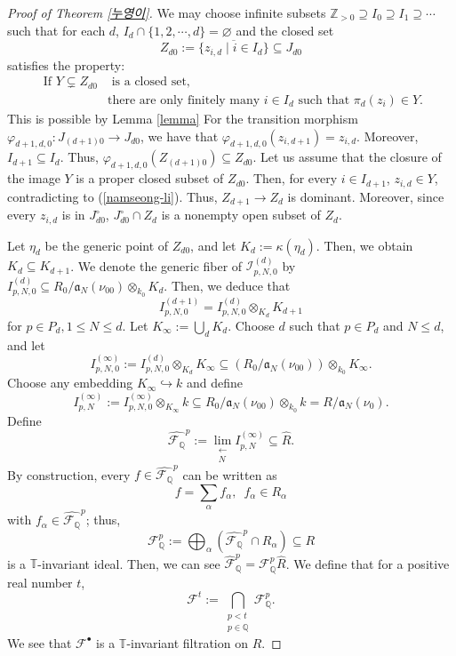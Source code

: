 \documentclass[a4paper,12pt]{amsart}
\theoremstyle{definition} %
\theoremstyle{remark}
\numberwithin{equation}{section}
\newcommand{\Z}{\mathbb{Z}}
\newcommand{\Q}{\mathbb{Q}}
\begin{document}
\begin{proof}[Proof of Theorem \ref{누영이}]
\smallskip

We may choose infinite subsets $\Z_{>0}\supseteq I_0\supseteq I_1\supseteq \cdots$ such that for each $d$, $I_d\cap \{1,2,\cdots,d\}=\varnothing$ and the closed set
$$ Z_{d0}:=\overline{\{z_{i,d}\mid i\in I_d\}}\subseteq J_{d0} $$
satisfies the property:
\begin{equation} \label{namseong-li}
\begin{aligned}\text{ If }Y\subsetneq Z_{d0}&\text{ is a closed set, }\\ &\text{there are only finitely many }i\in I_d\text{ such that }\pi_d(z_i)\in Y.
\end{aligned}
\end{equation}
This is possible by Lemma \ref{lemma} For the transition morphism $\varphi_{d+1,d,0}:J_{(d+1)0}\to J_{d0}$, we have that $\varphi_{d+1,d,0}(z_{i,d+1})=z_{i,d}$. Moreover, $I_{d+1}\subseteq I_d$. Thus, $\varphi_{d+1,d,0}(Z_{(d+1)0})\subseteq Z_{d0}$. Let us assume that the closure of the image $Y$ is a proper closed subset of $Z_{d0}$. Then, for every $i\in I_{d+1}$, $z_{i,d}\in Y$, contradicting to (\ref{namseong-li}). Thus, $Z_{d+1}\to Z_d$ is dominant. Moreover, since every $z_{i,d}$ is in $J^{\circ}_{d0}$, $J^{\circ}_{d0}\cap Z_d$ is a nonempty open subset of $Z_d$.

\smallskip

Let $\eta_d$ be the generic point of $Z_{d0}$, and let $K_d:=\kappa(\eta_d)$. Then, we obtain $K_d\subseteq K_{d+1}$. We denote the generic fiber of $\mathcal{I}^{(d)}_{p,N,0}$ by $I^{(d)}_{p,N,0}\subseteq R_{0}/\mathfrak{a}_N(\nu_{00})\otimes_{k_0} K_d$. Then, we deduce that
$$ I^{(d+1)}_{p,N,0}=I^{(d)}_{p,N,0}\otimes_{K_d}K_{d+1}$$
for $p\in P_d,1\le N\le d$. Let $K_{\infty}:=\bigcup_d K_d$. Choose $d$ such that $p\in P_d$ and $N\le d$, and let
$$ I^{(\infty)}_{p,N,0}:=I^{(d)}_{p,N,0}\otimes_{K_d} K_{\infty}\subseteq (R_{0}/\mathfrak{a}_N(\nu_{00}))\otimes_{k_0} K_{\infty}.$$
Choose any embedding $K_{\infty}\hookrightarrow k$ and define
$$ I^{(\infty)}_{p,N}:=I^{(\infty)}_{p,N,0}\otimes_{K_{\infty}}k\subseteq R_{0}/\mathfrak{a}_N(\nu_{00})\otimes_{k_0}k=R/\mathfrak{a}_N(\nu_{0}).$$
Define
$$ \widehat{\mathcal{F}_{\mathbb{Q}}}^p:=\lim_{\substack{\longleftarrow \\  N}}I^{(\infty)}_{p,N}\subseteq \widehat{R}.$$
By construction, every $f\in \widehat{\mathcal{F}_{\mathbb{Q}}}^p$ can be written as
$$ f=\sum_{\alpha}f_{\alpha},\,\,\,f_{\alpha}\in R_{\alpha}$$
with $f_{\alpha}\in \widehat{\mathcal{F}_{\mathbb{Q}}}^p$; thus,
$$ \mathcal{F}^p_{\mathbb{Q}}:=\bigoplus_{\alpha}(\widehat{\mathcal{F}_{\mathbb{Q}}}^p\cap R_{\alpha})\subseteq R$$
is a $\mathbb{T}$-invariant ideal. Then, we can see $\widehat{\mathcal{F}}^p_{\mathbb{Q}}=\mathcal{F}^p_{\mathbb{Q}}\widehat{R}$. We define that for a positive real number $t$,
$$ \mathcal{F}^t:=\bigcap_{\substack{p<t \\ p\in \Q}}\mathcal{F}^p_{\mathbb{Q}}.$$
We see that $\mathcal{F}^{\bullet}$ is a $\mathbb{T}$-invariant filtration on $R$.


\end{proof}
\end{document}
